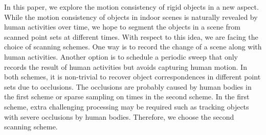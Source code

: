 In this paper, we explore the motion consistency of rigid objects in a new aspect.
While the motion consistency of objects in indoor scenes is naturally revealed by human activities over time, we hope to segment the objects in a scene from scanned point sets at different times. 
%
With respect to this idea, we are facing the choice of scanning schemes. One way is to record the change of a scene along with human activities. Another option is to schedule a periodic sweep that only records the result of human activities but avoids capturing human motion. 
In both schemes, it is non-trivial to recover object correspondences in different point sets due to occlusions.
The occlusions are probably caused by human bodies in the first scheme or sparse sampling on times in the second scheme. 
%
In the first scheme, extra challenging processing may be required such as tracking objects with severe occlusions by human bodies. Therefore, we choose the second scanning scheme. 

